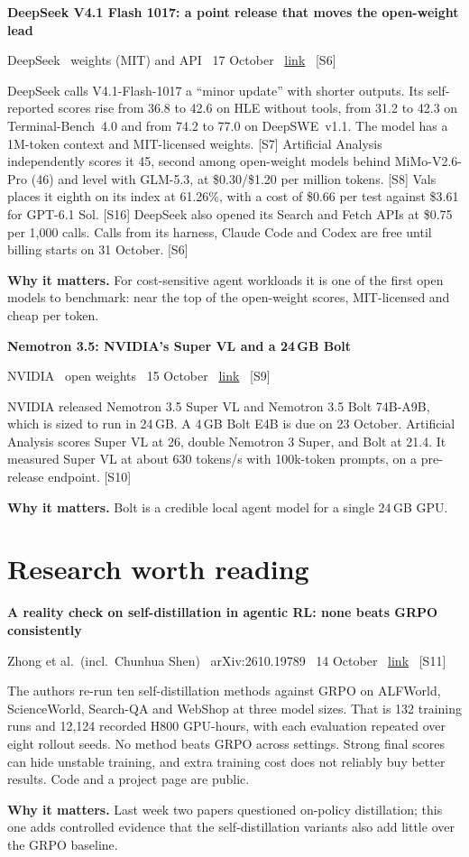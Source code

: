 \documentclass[11pt,a4paper]{article}
\newcommand{\entry}[4]{%
  \par\vspace{0.7em}%
  {\sffamily\bfseries\color{brandink}#1}\par
  {\footnotesize\color{brandgrey}#2 \textbullet\ \href{#3}{link} \textbullet\ \srcref{#4}}\par
  \vspace{0.15em}}
\newcommand{\why}[1]{\par{\small\textbf{Why it matters.} #1}\par}
\newcommand{\srcref}[1]{\textcolor{brandaccent}{[S#1]}}
\begin{document}
\entry{DeepSeek V4.1 Flash 1017: a point release that moves the open-weight lead}{DeepSeek \textbullet\ weights (MIT) and API \textbullet\ 17 October}{https://api-docs.deepseek.com/news/news261017}{6}
DeepSeek calls V4.1-Flash-1017 a ``minor update'' with shorter outputs. Its self-reported scores
rise from 36.8 to 42.6 on HLE without tools, from 31.2 to 42.3 on Terminal-Bench~4.0 and from 74.2 to 77.0 on DeepSWE~v1.1.
The model has a 1M-token context and MIT-licensed weights. \srcref{7} Artificial Analysis independently scores
it 45, second among open-weight models behind MiMo-V2.6-Pro (46) and level with GLM-5.3, at \$0.30/\$1.20 per million tokens. \srcref{8}
Vals places it eighth on its index at 61.26\%, with a cost of \$0.66 per test against \$3.61 for GPT-6.1 Sol. \srcref{16}
DeepSeek also opened its Search and Fetch APIs at \$0.75 per 1,000 calls. Calls from its harness,
Claude Code and Codex are free until billing starts on 31 October. \srcref{6}
\why{For cost-sensitive agent workloads it is one of the first open models to benchmark: near the top of the open-weight scores, MIT-licensed and cheap per token.}

\entry{Nemotron 3.5: NVIDIA's Super VL and a 24\,GB Bolt}{NVIDIA \textbullet\ open weights \textbullet\ 15 October}{https://blogs.nvidia.com/blog/nemotron-3-5-super-vl/}{9}
NVIDIA released Nemotron 3.5 Super VL and Nemotron 3.5 Bolt 74B-A9B, which is sized to run in 24\,GB. A 4\,GB Bolt E4B is due on
23 October. Artificial Analysis scores Super VL at 26, double Nemotron 3 Super, and Bolt at 21.4. It measured Super VL at
about 630 tokens/s with 100k-token prompts, on a pre-release endpoint. \srcref{10}
\why{Bolt is a credible local agent model for a single 24\,GB GPU.}

\section{Research worth reading}

\entry{A reality check on self-distillation in agentic RL: none beats GRPO consistently}{Zhong et al.\ (incl.\ Chunhua Shen) \textbullet\ arXiv:2610.19789 \textbullet\ 14 October}{https://arxiv.org/abs/2610.19789}{11}
The authors re-run ten self-distillation methods against GRPO on ALFWorld, ScienceWorld, Search-QA and WebShop
at three model sizes. That is 132 training runs and 12,124 recorded H800 GPU-hours, with each evaluation repeated over eight rollout seeds.
No method beats GRPO across settings. Strong final scores can hide unstable training, and extra training
cost does not reliably buy better results. Code and a project page are public.
\why{Last week two papers questioned on-policy distillation; this one adds controlled evidence that the self-distillation variants also add little over the GRPO baseline.}
\end{document}
